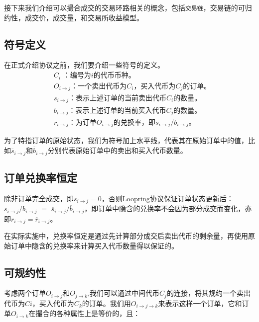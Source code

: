 \documentclass[UTF8,nofonts]{ctexart}
\begin{document}
接下来我们介绍可以撮合成交的交易环路相关的概念，包括\texttt{交易链}，交易链的可归约性，成交价，成交量，和交易所收益模型。

\subsection{符号定义}

在正式介绍协议之前，我们要介绍一些符号的定义。
\[
\begin{split}
&C_{i}\text{ ：}\text{编号为$i$的代币币种。}\\
&O_{i\rightarrow j}\text{：}\text{一个卖出代币为$C_{i}$，买入代币为$C_{j}$的订单。}\\
&s_{i\rightarrow j}\text{：}\text{表示上述订单的当前卖出代币$C_{i}$的数量。}\\
&b_{i\rightarrow j}\text{：}\text{表示上述订单的当前买入代币$C_{j}$的数量。}\\
&r_{i\rightarrow j}\text{：}\text{为订单$O_{i\rightarrow j}$的兑换率，即$s_{i\rightarrow j} / b_{i\rightarrow j}$。}
\end{split}
\]


为了特指订单的原始状态，我们为符号加上水平线，代表其在原始订单中的值，比如$\overline{s}_{i\rightarrow j}$和$\overline{b}_{i\rightarrow j}$分别代表原始订单中的卖出和买入代币数量。

\subsection{订单兑换率恒定\label{sec:consistrate}}

除非订单完全成交，即$s_{i\rightarrow j} = 0$，否则Loopring协议保证订单状态更新后：
$s_{i\rightarrow j} / b_{i\rightarrow j}$ $=$ $\overline{s}_{i\rightarrow j} / \overline{b}_{i\rightarrow j}$，即订单中隐含的兑换率不会因为部分成交而变化，亦即$r_{i\rightarrow j} = \overline{r}_{i\rightarrow j}$。

在实际实施中，兑换率恒定是通过先计算部分成交后卖出代币的剩余量，再使用原始订单中隐含的兑换率来计算买入代币数量得以保证的。

\subsection{可规约性\label{sec:reducability}}


考虑两个订单$O_{i\rightarrow j}$和$O_{j\rightarrow k}$,我们可以通过中间代币$C_j$的连接，将其规约一个卖出代币为$Ci$，买入代币为$C_k$的订单。我们用$O_{i\rightarrow j\rightarrow k}$来表示这样一个订单，它和订单$O_{i\rightarrow k}$在撮合的各种属性上是等价的，且：
\end{document}

